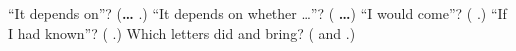 \begin{tcolorbox}[breakable,colback=teal!4,colframe=teal!35!black,title={Before you move on}]
\textquotedblleft{}It depends on\textquotedblright{}? (\textbf{…    }.) \textquotedblleft{}It depends on whether …\textquotedblright{}? (\textbf{       …}) \textquotedblleft{}I would come\textquotedblright{}? (\textbf{ }.) \textquotedblleft{}If I had known\textquotedblright{}? (\textbf{   }.) Which letters did \textbf{} and \textbf{} bring? (\textbf{} and \textbf{}.)
\end{tcolorbox}
